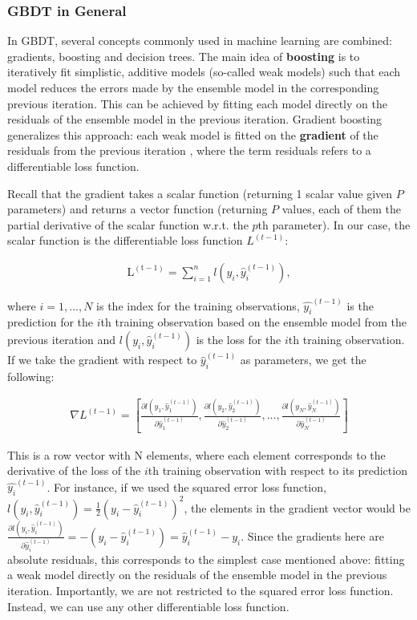\documentclass{article}
\begin{document}
	
	\subsubsection{GBDT in General}
	
	In GBDT, several concepts commonly used in machine learning are combined: gradients, boosting and decision trees. The main idea of \textbf{boosting} is to iteratively fit simplistic, additive models (so-called weak models) such that each model reduces the errors made by the ensemble model in the corresponding previous iteration. This can be achieved by fitting each model directly on the residuals of the ensemble model in the previous iteration. Gradient boosting generalizes this approach: each weak model is fitted on the \textbf{gradient} of the residuals from the previous iteration  \cite{chen_xgboost:_2016} \cite{friedman_greedy_2001}  \cite{noauthor_kaggle_nodate}, where the term residuals refers to a differentiable loss function.
	
	Recall that the gradient takes a scalar function (returning 1 scalar value given $P$ parameters) and returns a vector function (returning $P$ values, each of them the partial derivative of the scalar function w.r.t. the $p$th parameter). In our case, the scalar function is the differentiable loss function $L^{(t-1)}$:

	\begin{align}
	\mathrm{L^{(t-1)}} = \sum_{i=1}^n l(y_i, \hat{y}_i^{(t-1)}), 
	\end{align} 
	
	where $i = 1, ..., N$ is the index for the training observations, $\hat{y_i}^{(t-1)}$ is the prediction for the $i$th training observation based on the ensemble model from the previous iteration and $l(y_i, \hat{y}_i^{(t-1)})$ is the loss for the $i$th training observation. If we take the gradient with respect to $\hat{y}_i^{(t-1)}$ as parameters, we get the following:
	
	\begin{align}
		\nabla L^{(t-1)} = \left[\frac{\partial l(y_1, \hat{y}_1^{(t-1)})}{\partial \hat{y}_1^{(t-1)}}, \frac{\partial l(y_2, \hat{y}_2^{(t-1)})}{\partial \hat{y}_2^{(t-1)}}, ..., \frac{\partial l(y_N, \hat{y}_N^{(t-1)})}{\partial \hat{y}_N^{(t-1)}}\right]
	\end{align}
	
	This is a row vector with N elements, where each element corresponds to the derivative of the loss of the $i$th training observation with respect to its prediction $\hat{y_i}^{(t-1)}$. For instance, if we used the squared error loss function, $l(y_i, \hat{y}_i^{(t-1)}) = \frac{1}{2} \left(y_i - \hat{y}_i^{(t-1)}\right)^2$, the elements in the gradient vector would be $\frac{\partial l(y_i, \hat{y}_i^{(t-1)})}{\partial \hat{y}_i^{(t-1)}} = -\left(y_i - \hat{y}_i^{(t-1)}\right) = \hat{y}_i^{(t-1)} - y_i$. Since the gradients here are absolute residuals, this corresponds to the simplest case mentioned above: fitting a weak model directly on the residuals of the ensemble model in the previous iteration. Importantly, we are not restricted to the squared error loss function. Instead, we can use any other differentiable loss function.
	
\end{document}
